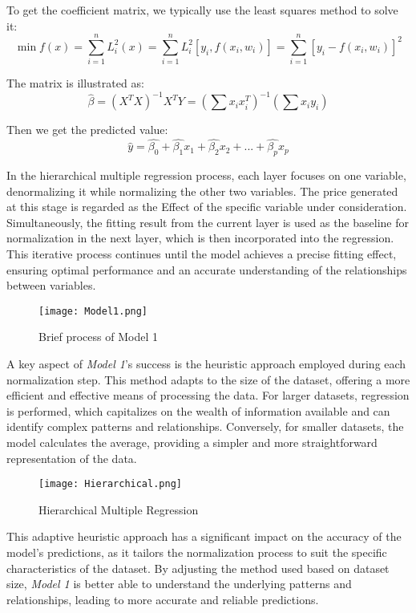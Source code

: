 \documentclass[12pt]{article}  %
\begin{document}
To get the coefficient matrix, we typically use the least squares method to solve it:
$$\min f(x)=\sum_{i=1}^{n}L^2_i(x)=\sum_{i=1}^{n}L_i^2[y_i,f(x_i,w_i)]=\sum_{i=1}^{n}[y_i-f(x_i,w_i)]^2$$

The matrix is illustrated as:
$$\hat{\beta}=(X^TX)^{-1}X^TY=(\sum x_ix_i^T)^{-1}(\sum x_iy_i)$$

Then we get the predicted value:
$$\hat{y} = \hat{\beta_0} + \hat{\beta_1} x_1 + \hat{\beta_2} x_2 + ... + \hat{\beta_p} x_p$$

In the hierarchical multiple regression process, each layer focuses on one variable, denormalizing it while normalizing the other two variables. The price generated at this stage is regarded as the Effect of the specific variable under consideration. Simultaneously, the fitting result from the current layer is used as the baseline for normalization in the next layer, which is then incorporated into the regression. This iterative process continues until the model achieves a precise fitting effect, ensuring optimal performance and an accurate understanding of the relationships between variables.
\begin{figure}[htbp]
    \centering
    \texttt{[image: Model1.png]}
    \caption{Brief process of Model 1}\label{fig:Model1}
\end{figure}
A key aspect of \emph{Model 1}'s success is the heuristic approach employed during each normalization step. This method adapts to the size of the dataset, offering a more efficient and effective means of processing the data. For larger datasets, regression is performed, which capitalizes on the wealth of information available and can identify complex patterns and relationships. Conversely, for smaller datasets, the model calculates the average, providing a simpler and more straightforward representation of the data.

\begin{figure}[htbp]
    \centering
    \texttt{[image: Hierarchical.png]}
    \caption{Hierarchical Multiple Regression}\label{fig:Hierarchical}
\end{figure}

This adaptive heuristic approach has a significant impact on the accuracy of the model's predictions, as it tailors the normalization process to suit the specific characteristics of the dataset. By adjusting the method used based on dataset size, \emph{Model 1} is better able to understand the underlying patterns and relationships, leading to more accurate and reliable predictions.
\end{document}
